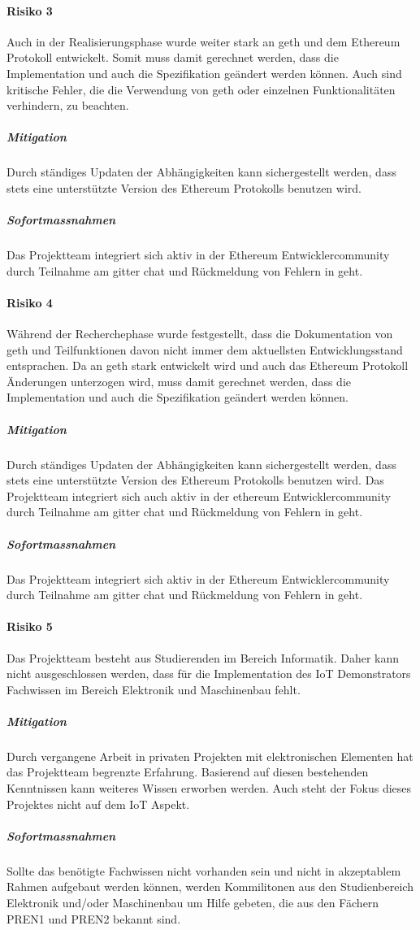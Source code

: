 \paragraph{Risiko 3}
Auch in der Realisierungsphase wurde weiter stark an geth und dem Ethereum Protokoll entwickelt. Somit muss damit gerechnet werden, dass die Implementation und auch die Spezifikation geändert werden können. Auch sind kritische Fehler, die die Verwendung von geth oder einzelnen Funktionalitäten verhindern, zu beachten.\cite[EIPs]{github.com/ethereum}
\subparagraph{Mitigation}
Durch ständiges Updaten der Abhängigkeiten kann sichergestellt werden, dass stets eine unterstützte Version des Ethereum Protokolls benutzen wird.
\subparagraph{Sofortmassnahmen}
Das Projektteam integriert sich aktiv in der Ethereum Entwicklercommunity durch Teilnahme am gitter chat und Rückmeldung von Fehlern in geht.

\paragraph{Risiko 4}
Während der Recherchephase wurde festgestellt, dass die Dokumentation von geth und Teilfunktionen davon nicht immer dem aktuellsten Entwicklungsstand entsprachen. Da an geth stark entwickelt wird und auch das Ethereum Protokoll Änderungen unterzogen wird, muss damit gerechnet werden, dass die Implementation und auch die Spezifikation geändert werden können.
\subparagraph{Mitigation}
Durch ständiges Updaten der Abhängigkeiten kann sichergestellt werden, dass stets eine unterstützte Version des Ethereum Protokolls benutzen wird. Das Projektteam integriert sich auch aktiv in der ethereum Entwicklercommunity durch Teilnahme am gitter chat und Rückmeldung von Fehlern in geht.
\subparagraph{Sofortmassnahmen}
Das Projektteam integriert sich aktiv in der Ethereum Entwicklercommunity durch Teilnahme am gitter chat und Rückmeldung von Fehlern in geht.

\paragraph{Risiko 5}
Das Projektteam besteht aus Studierenden im Bereich Informatik. Daher kann nicht ausgeschlossen werden, dass für die Implementation des IoT Demonstrators Fachwissen im Bereich Elektronik und Maschinenbau fehlt.
\subparagraph{Mitigation}
Durch vergangene Arbeit in privaten Projekten mit elektronischen Elementen hat das Projektteam begrenzte Erfahrung. Basierend auf diesen bestehenden Kenntnissen kann weiteres Wissen erworben werden. Auch steht der Fokus dieses Projektes nicht auf dem IoT Aspekt.
\subparagraph{Sofortmassnahmen}
Sollte das benötigte Fachwissen nicht vorhanden sein und nicht in akzeptablem Rahmen aufgebaut werden können, werden Kommilitonen aus den Studienbereich Elektronik und/oder Maschinenbau um Hilfe gebeten, die aus den Fächern PREN1 und PREN2 bekannt sind.

